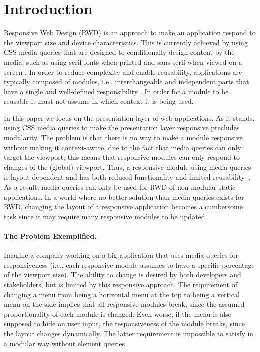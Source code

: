 \documentclass[lnbip]{svmultln}
\begin{document}
\section{Introduction}

  Responsive Web Design (RWD) is an approach to make an application respond to the viewport size and device characteristics.
  This is currently achieved by using CSS media queries that are designed to conditionally design content by the media, such as using serif fonts when printed and sans-serif when viewed on a screen \cite{w3c_css_mq}.
  In order to reduce complexity and enable reusability, applications are typically composed of modules, i.e., interchangeable and independent parts that have a single and well-defined responsibility \cite{parnas1972criteria}.
  In order for a module to be reusable it must not assume in which context it is being used.

  In this paper we focus on the presentation layer of web applications.
  As it stands, using CSS media queries to make the presentation layer responsive precludes modularity.
  The problem is that there is no way to make a module responsive without making it context-aware, due to the fact that media queries can only target the viewport; this means that responsive modules can only respond to changes of the (global) viewport.
  Thus, a responsive module using media queries is layout dependent and has both reduced functionality and limited reusability~\cite{elq-thesis}.
  As a result, media queries can only be used for RWD of non-modular static applications.
  In a world where no better solution than media queries exists for RWD, changing the layout of a responsive application becomes a cumbersome task since it may require many responsive modules to be updated.

  \paragraph{The Problem Exemplified.}
    Imagine a company working on a big application that uses media queries for responsiveness (i.e., each responsive module assumes to have a specific percentage of the viewport size).
    The ability to change is desired by both developers and stakeholders, but is limited by this responsive approach.
    The requirement of changing a menu from being a horizontal menu at the top to being a vertical menu on the side implies that all responsive modules break, since the assumed proportionality of each module is changed.
    Even worse, if the menu is also supposed to hide on user input, the responsiveness of the module breaks, since the layout changes dynamically.
    The latter requirement is impossible to satisfy in a modular way without element queries.
\end{document}
